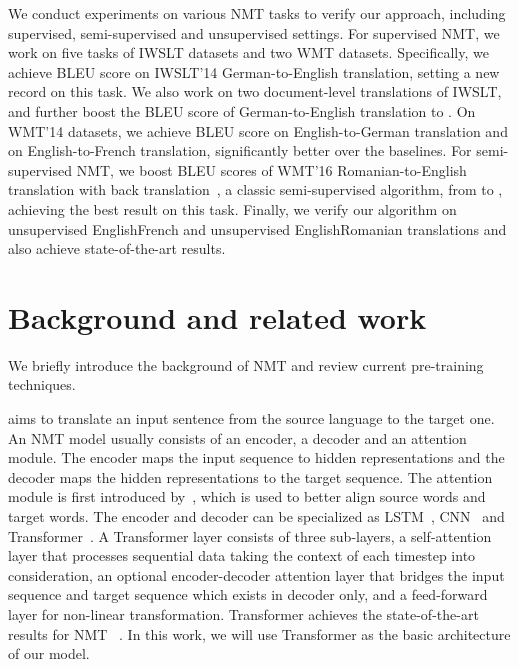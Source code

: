 \documentclass{article} \usepackage{iclr2020_conference,times}
\begin{document}
We conduct  experiments on various NMT tasks to verify our approach, including supervised, semi-supervised and unsupervised settings. For supervised NMT, we work on five tasks of IWSLT datasets and two WMT datasets. Specifically, we achieve  BLEU score on IWSLT'14 German-to-English translation, setting a new record on this task. We also work on two document-level translations of IWSLT, and further boost the BLEU score of German-to-English translation to . On WMT'14 datasets, we achieve  BLEU score on English-to-German translation and  on English-to-French translation, significantly better over the baselines. For semi-supervised NMT, we boost BLEU scores of WMT'16 Romanian-to-English translation with back translation~\citep{sennrich2016improving}, a classic semi-supervised algorithm, from  to , achieving the best result on this task. Finally, we verify our algorithm on unsupervised EnglishFrench and unsupervised EnglishRomanian translations and also achieve state-of-the-art results. 




\section{Background and related work}
\label{sec:related_work}
We briefly introduce the background of NMT and review current pre-training techniques.

 aims to translate an input sentence from the source language to the target one. An NMT model usually consists of an encoder, a decoder and an attention module. The encoder maps the input sequence to hidden representations and the decoder maps the hidden representations to the target sequence. The attention module is first introduced by~\cite{bahdanau2014neural}, which is used to better align source words and target words. The encoder and decoder can be specialized as LSTM~\citep{Hochreiter:1997:LSM:1246443.1246450,sutskever2014sequence,wu2016google}, CNN~\citep{gehring2017convolutional} and Transformer~\citep{vaswani2017attention}. A Transformer layer consists of three sub-layers, a self-attention layer that processes sequential data taking the context of each timestep into consideration, an optional encoder-decoder attention layer that bridges the input sequence and target sequence which exists in decoder only, and a feed-forward layer for non-linear transformation. Transformer achieves the state-of-the-art results for NMT ~\citep{barrault-EtAl:2019:WMT}. In this work, we will use Transformer as the basic architecture of our model.
\end{document}
